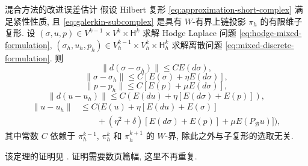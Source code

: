 \begin{Theorem}{{混合方法的改进误差估计}}\label{thm:mixed-improved-errors}
{假设 Hilbert 复形 \eqref{eq:approximation-short-complex} 满足紧性性质, 且 \eqref{eq:galerkin-subcomplex} 是具有 $W$-有界上链投影 $\pi_h$ 的有限维子复形. 设 $(\sigma,u,p)\in V^{k-1}\times V^k\times\mathsf H^k$ 求解 Hodge Laplace 问题 \eqref{eq:hodge-mixed-formulation}, $(\sigma_h,u_h,p_h)\in V_h^{k-1}\times V_h^k\times\mathsf H_h^k$ 求解离散问题 \eqref{eq:mixed-discrete-formulation}. 则}
\begin{equation}\label{eq:mixed-improved-dsigma}
\|d(\sigma-\sigma_h)\|\leq CE(d\sigma),
\end{equation}
\begin{equation}\label{eq:mixed-improved-sigma}
\|\sigma-\sigma_h\|\leq C[E(\sigma)+\eta E(d\sigma)],
\end{equation}
\begin{equation}\label{eq:mixed-improved-p}
\|p-p_h\|\leq C[E(p)+\mu E(d\sigma)],
\end{equation}
\begin{equation}\label{eq:mixed-improved-du}
\|d(u-u_h)\|\leq C(E(du)+\eta[E(d\sigma)+E(p)]),
\end{equation}
\begin{equation}\label{eq:mixed-improved-u}
\begin{aligned}
\|u-u_h\|&\leq C\big(E(u)+\eta[E(du)+E(\sigma)]\\
&\qquad+(\eta^2+\delta)[E(d\sigma)+E(p)]+\mu E(P_{\mathcal B}u)]\big),
\end{aligned}
\end{equation}
{其中常数 $C$ 依赖于 $\pi_h^{k-1}$, $\pi_h^k$ 和 $\pi_h^{k+1}$ 的 $W$-界, 除此之外与子复形的选取无关.}
\end{Theorem}

{该定理的证明见 . 证明需要数页篇幅, 这里不再重复.}


